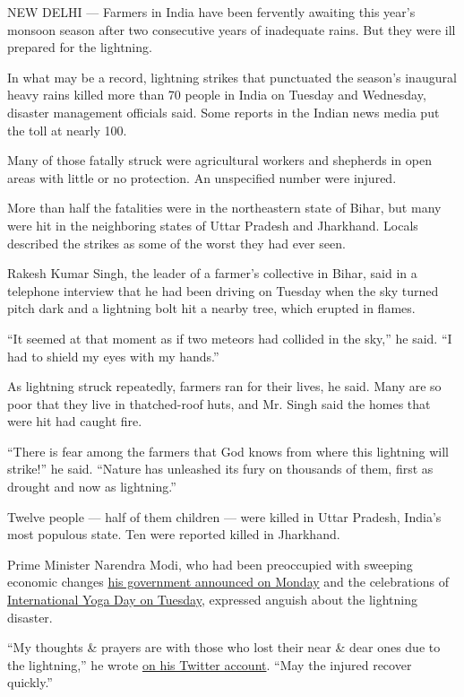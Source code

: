 NEW DELHI --- Farmers in India have been fervently awaiting this year's
monsoon season after two consecutive years of inadequate rains. But they
were ill prepared for the lightning.

In what may be a record, lightning strikes that punctuated the season's
inaugural heavy rains killed more than 70 people in India on Tuesday and
Wednesday, disaster management officials said. Some reports in the
Indian news media put the toll at nearly 100.

Many of those fatally struck were agricultural workers and shepherds in
open areas with little or no protection. An unspecified number were
injured.

More than half the fatalities were in the northeastern state of Bihar,
but many were hit in the neighboring states of Uttar Pradesh and
Jharkhand. Locals described the strikes as some of the worst they had
ever seen.

Rakesh Kumar Singh, the leader of a farmer's collective in Bihar, said
in a telephone interview that he had been driving on Tuesday when the
sky turned pitch dark and a lightning bolt hit a nearby tree, which
erupted in flames.

``It seemed at that moment as if two meteors had collided in the sky,''
he said. ``I had to shield my eyes with my hands.''

As lightning struck repeatedly, farmers ran for their lives, he said.
Many are so poor that they live in thatched-roof huts, and Mr. Singh
said the homes that were hit had caught fire.

``There is fear among the farmers that God knows from where this
lightning will strike!'' he said. ``Nature has unleashed its fury on
thousands of them, first as drought and now as lightning.''

Twelve people --- half of them children --- were killed in Uttar
Pradesh, India's most populous state. Ten were reported killed in
Jharkhand.

Prime Minister Narendra Modi, who had been preoccupied with sweeping
economic changes
\href{http://www.nytimes.com/2016/06/21/world/asia/india-needing-jobs-eases-rules-on-foreign-investment.html}{his
government announced on Monday} and the celebrations of
\href{http://www.thehindu.com/news/national/make-yoga-a-part-of-your-life-says-pm-modi/article8754725.ece}{International
Yoga Day on Tuesday}, expressed anguish about the lightning disaster.

``My thoughts \& prayers are with those who lost their near \& dear ones
due to the lightning,'' he wrote
\href{https://twitter.com/PMOIndia/status/745530357642993664}{on his
Twitter account}. ``May the injured recover quickly.''


